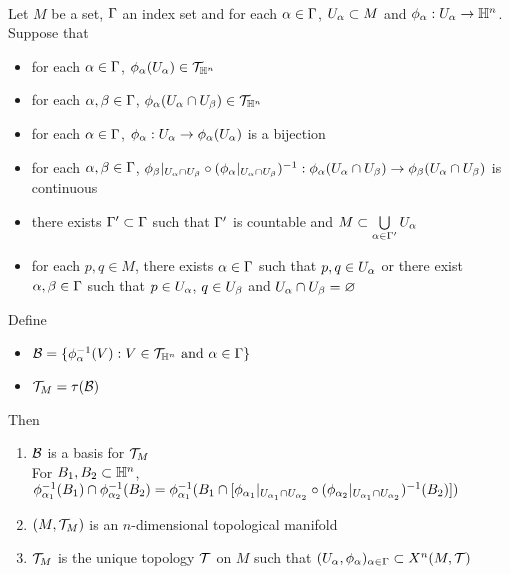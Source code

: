 \documentclass{book}
\begin{document}
	\begin{ex}  \\
		Let $M$ be a set, $\Gamma$ an index set and for each $\alpha \in \Gamma$, $U_{\alpha} \subset M$ and $\phi_{\alpha}: U_{\alpha} \rightarrow \mathbb{H}^n$. Suppose that 
		\begin{itemize}
			\item for each $\alpha \in \Gamma$, $\phi_{\alpha}(U_{\alpha}) \in \mathcal{T}_{\mathbb{H}^n}$ 
			\item for each $\alpha, \beta \in \Gamma$, $\phi_{\alpha}(U_{\alpha} \cap U_{\beta}) \in \mathcal{T}_{\mathbb{H}^n}$
			\item for each $\alpha \in \Gamma$, $\phi_{\alpha}: U_{\alpha} \rightarrow \phi_{\alpha}(U_{\alpha})$ is a bijection
			\item for each $\alpha, \beta \in \Gamma$, $\phi_{\beta}|_{U_{\alpha} \cap U_{\beta}} \circ (\phi_{\alpha}|_{U_{\alpha} \cap U_{\beta}})^{-1}: \phi_{\alpha}(U_{\alpha} \cap U_{\beta}) \rightarrow \phi_{\beta}(U_{\alpha} \cap U_{\beta})$ is continuous
			\item there exists $\Gamma' \subset \Gamma$ such that $\Gamma'$ is countable and $M \subset \bigcup\limits_{\alpha \in \Gamma'} U_{\alpha}$
			\item for each $p,q \in M$, there exists $\alpha \in \Gamma$ such that $p,q \in U_{\alpha}$ or there exist $\alpha,\beta \in \Gamma$ such that $p \in U_{\alpha}$, $q \in U_{\beta}$ and $U_{\alpha} \cap U_{\beta} = \varnothing$
		\end{itemize}
		Define 
		\begin{itemize}
			\item $\mathcal{B} = \{\phi_{\alpha}^{-1}(V): V \in \mathcal{T}_{\mathbb{H}^n} \text{ and $\alpha \in \Gamma$} \}$
			\item $\mathcal{T}_M = \tau(\mathcal{B})$
		\end{itemize}
		Then  
		\begin{enumerate}
			\item $\mathcal{B}$ is a basis for $\mathcal{T}_M$ \\
			 For $B_1, B_2 \subset \mathbb{H}^n$, $\phi_{\alpha_1}^{-1}(B_1) \cap \phi_{\alpha_2}^{-1}(B_2) = \phi_{\alpha_1}^{-1}( B_1 \cap [\phi_{\alpha_1}|_{U_{\alpha_1} \cap U_{\alpha_2}} \circ (\phi_{\alpha_2}|_{U_{\alpha_1} \cap U_{\alpha_2}})^{-1}(B_2)])$
			\item $(M, \mathcal{T}_M)$ is an $n$-dimensional topological manifold
			\item $\mathcal{T}_M$ is the unique topology $\mathcal{T}$ on $M$ such that $(U_{\alpha}, \phi_{\alpha})_{\alpha \in \Gamma} \subset X^n(M, \mathcal{T})$
		\end{enumerate}
	\end{ex}
	
\end{document}
